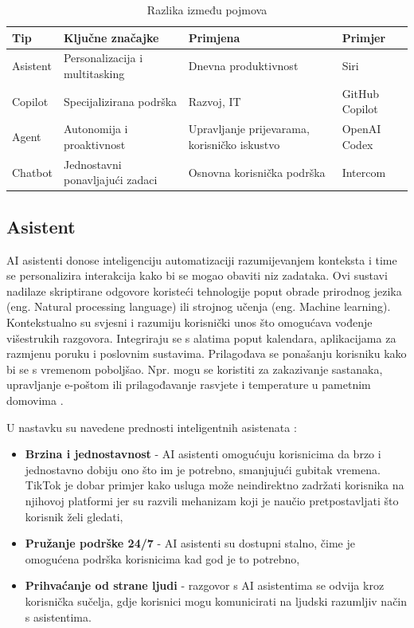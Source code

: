 \documentclass[]{foi}
\begin{document}
\begin{table}[h!]
\centering
\begin{tabularx}{\textwidth}{|l|X|X|X|}
\hline
\textbf{Tip}    & \textbf{Ključne značajke}         & \textbf{Primjena}                              & \textbf{Primjer}             \\
\hline
Asistent        & Personalizacija i multitasking    & Dnevna produktivnost                           & Siri         \\
\hline
Copilot         & Specijalizirana podrška           & Razvoj, IT                                     & GitHub Copilot                \\
\hline
Agent           & Autonomija i proaktivnost         & Upravljanje prijevarama, korisničko iskustvo   & OpenAI Codex                  \\
\hline
Chatbot         & Jednostavni ponavljajući zadaci   & Osnovna korisnička podrška                     & Intercom                       \\
\hline
\end{tabularx}
\caption{Razlika između pojmova \cite{exomindset2025difference}}
\label{tab:chatbot_usporedba}
\end{table}
\newpage

\subsection{Asistent}

AI asistenti donose inteligenciju automatizaciji razumijevanjem konteksta i time se personalizira interakcija kako bi se mogao obaviti niz zadataka. Ovi sustavi nadilaze skriptirane odgovore
koristeći tehnologije poput obrade prirodnog jezika (eng. Natural processing language) ili strojnog učenja (eng. Machine learning). Kontekstualno su svjesni i razumiju korisnički unos što omogućava
vođenje višestrukih razgovora. Integriraju se s alatima poput kalendara, aplikacijama za razmjenu poruku i poslovnim sustavima. Prilagođava se ponašanju korisniku kako bi se s vremenom poboljšao.
Npr. mogu se koristiti za zakazivanje sastanaka, upravljanje e-poštom ili prilagođavanje rasvjete i temperature u pametnim domovima \cite{exomindset2025difference}.

U nastavku su navedene prednosti inteligentnih asistenata \cite{buchan2024ai}:
\begin{itemize}
    \item \textbf{Brzina i jednostavnost} - AI asistenti omogućuju korisnicima da brzo i jednostavno dobiju ono što im je potrebno, smanjujući
    gubitak vremena. TikTok je dobar primjer kako usluga može neindirektno zadržati korisnika na njihovoj platformi jer su razvili mehanizam koji
    je naučio pretpostavljati što korisnik želi gledati,
    \item \textbf{Pružanje podrške 24/7} - AI asistenti su dostupni stalno, čime je omogućena podrška korisnicima kad god je to potrebno, 
    \item \textbf{Prihvaćanje od strane ljudi} - razgovor s AI asistentima se odvija kroz korisnička sučelja, gdje korisnici mogu
    komunicirati na ljudski razumljiv način s asistentima. 
\end{itemize}
\end{document}
